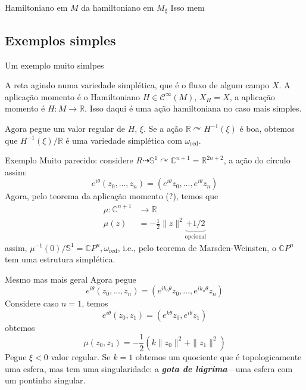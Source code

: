 \begin{idea6}{Hamiltoniano em $M$ da hamiltoniano em $M_\xi$}\leavevmode
	Isso mem
\end{idea6}

\subsection{Exemplos simples}

\begin{idea4}{Um exemplo muito simlpes}\leavevmode
	
A reta agindo numa variedade simplética, que é o fluxo de algum campo $X$. A aplicação momento é o Hamiltoniano $H\in\mathcal{C}^\infty(M)$, $X_H=X$, a aplicação momento é $H:M\longrightarrow \mathbb{R}$. Isso daqui é uma ação hamiltoniana no caso mais simples.

Agora pegue um valor regular de  $H$, $\xi$. Se a ação $\mathbb{R}\curvearrowright H^{-1}(\xi)$ é boa, obtemos que $H^{-1}(\xi)/\mathbb{R}$ é uma variedade simplética com $\omega_{\operatorname{red}}$.
\end{idea4}

\begin{idea3}{Exemplo}\leavevmode
	Muito parecido: considere $R\dashrightarrow \mathbb{S}^1\curvearrowright \mathbb{C}^{n+1}=\mathbb{R}^{2n+2}$, a ação do círculo assim:
	\[e^{i\theta}(z_0,\ldots,z_n)=(e^{i\theta}z_0,\ldots,e^{i\theta}z_n)\]
Agora, pelo teorema da aplicação momento (?), temos que
\begin{align*}
	\mu: \mathbb{C}^{n+1} &\longrightarrow \mathbb{R} \\
	\mu(z) &=-\frac{1}{2}\|z\|^2\underbrace{+1/2}_{\text{opcional} }
\end{align*}
assim, $\mu^{-1}(0)/\mathbb{S}^1=\mathbb{C}P^{n},\omega_{\operatorname{red}}$, i.e., {\color{3}pelo teorema de Marsden-Weinsten, o $\mathbb{C}P^{n}$ tem uma estrutura simplética}.
\end{idea3}

\begin{idea4}{Mesmo mas mais geral}\leavevmode
	Agora pegue
	\[e^{i\theta}(z_0,\ldots,z_n)=(e^{ik_0\theta}z_0,\ldots,e^{ik_n\theta}z_n)\]
	Considere caso $n=1$, temos
	\[e^{i\theta}(z_0,z_1)=(e^{k\theta}z_0,e^{i\theta}z_1)\]
	obtemos
	\[\mu(z_0,z_1)=-\frac{1}{2}\left( k\|z_0\|^2+\|z_1\|^2 \right) \]
	Pegue $\xi<0$ valor regular. Se $k=1$ obtemos um quociente que  é topologicamente uma esfera, mas tem uma singularidade: a \textit{\textbf{gota de lágrima}}---uma esfera com um pontinho singular.
\end{idea4}

